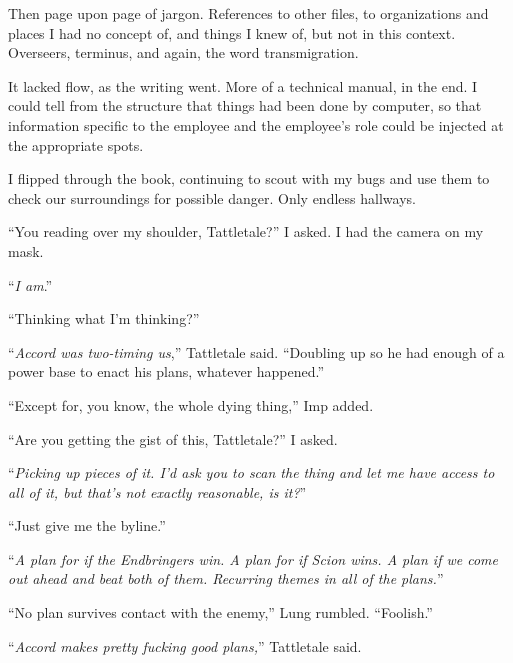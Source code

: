 Then page upon page of jargon.  References to other files, to organizations and places I had no concept of, and things I knew of, but not in this context.  Overseers, terminus, and again, the word transmigration.



It lacked flow, as the writing went.  More of a technical manual, in the end.  I could tell from the structure that things had been done by computer, so that information specific to the employee and the employee's role could be injected at the appropriate spots.



I flipped through the book, continuing to scout with my bugs and use them to check our surroundings for possible danger.  Only endless hallways.



``You reading over my shoulder, Tattletale?'' I asked.  I had the camera on my mask.



``\emph{I am}.''



``Thinking what I'm thinking?''



``\emph{Accord was two-timing us},'' Tattletale said.  ``Doubling up so he had enough of a power base to enact his plans, whatever happened.''



``Except for, you know, the whole dying thing,'' Imp added.



``Are you getting the gist of this, Tattletale?''  I asked.



``\emph{Picking up pieces of it.  I'd ask you to scan the thing and let me have access to all of it, but that's not exactly reasonable, is it?}''



``Just give me the byline.''



``\emph{A plan for if the Endbringers win.  A plan for if Scion wins.  A plan if we come out ahead and beat both of them.  Recurring themes in all of the plans.}''



``No plan survives contact with the enemy,'' Lung rumbled.  ``Foolish.''



``\emph{Accord makes pretty fucking good plans,}'' Tattletale said.



